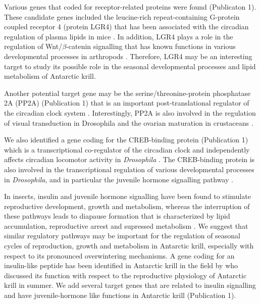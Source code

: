 Various genes that coded for receptor-related proteins were found (Publicaton
1). These candidate genes included the leucine-rich repeat-containing G-protein
coupled receptor 4 (protein LGR4) that has been associated with the circadian
regulation of plasma lipids in mice \citep{wang_lgr4_2014}. In addition, LGR4
plays a role in the regulation of Wnt/$\beta$-catenin signalling
\citep{carmon_r-spondins_2011} that has known functions in various
developmental processes in arthropods \citep{murat_function_2010}. Therefore,
LGR4 may be an interesting target to study its possible role in the seasonal
developmental processes and lipid metabolism of Antarctic krill.

Another potential target gene may be the serine/threonine-protein phosphatase
2A (PP2A) (Publication 1) that is an important post-translational regulator of
the circadian clock system \citep{pegoraro_animal_2011}. Interestingly, PP2A is
also involved in the regulation of visual transduction in Drosophila
\citep{wang_role_2008} and the ovarian maturation in crustaceans
\citep{zhao_molecular_2017}.

We also identified a gene coding for the CREB-binding protein (Publication 1)
which is a transcriptional co-regulator of the circadian clock and
independently affects circadian locomotor activity in \textit{Drosophila}
\citep{maurer_creb-binding_2016}. The CREB-binding protein is also involved in
the transcriptional regulation of various developmental processes in
\textit{Drosophila}, and in particular the juvenile hormone signalling pathway
\citep{roy_multiple_2017}.

In insects, insulin and juvenile hormone signalling have been found to
stimulate reproductive development, growth and metabolism, whereas the
interruption of these pathways leads to diapause formation that is
characterized by lipid accumulation, reproductive arrest and supressed
metabolism \citep{flatt_hormonal_2005, hahn_energetics_2011, liu_absence_2017,
schiesari_insulin-like_2016, sim_insulin_2013}. We suggest that similar
regulatory pathways may be important for the regulation of seasonal cycles of
reproduction, growth and metabolism in Antarctic krill, especially with respect
to its pronounced overwintering mechanisms. A gene coding for an insulin-like
peptide has been identified in Antarctic krill in the field by
\citet{seear_seasonal_2012} who discussed its function with respect to the
reproductive physiology of Antarctic krill in summer. We add several target
genes that are related to insulin signalling and have juvenile-hormone like
functions in Antarctic krill (Publication 1).

